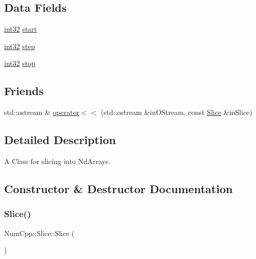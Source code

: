 \subsection*{Data Fields}
\begin{DoxyCompactItemize}
\item 
\mbox{\hyperlink{namespace_num_cpp_acf3eb1592f8b248ff0a236634864633c}{int32}} \mbox{\hyperlink{class_num_cpp_1_1_slice_a2b304f62d107e09756fdebf45029d333}{start}}
\item 
\mbox{\hyperlink{namespace_num_cpp_acf3eb1592f8b248ff0a236634864633c}{int32}} \mbox{\hyperlink{class_num_cpp_1_1_slice_a7a20894f3625159ed878124664887aff}{step}}
\item 
\mbox{\hyperlink{namespace_num_cpp_acf3eb1592f8b248ff0a236634864633c}{int32}} \mbox{\hyperlink{class_num_cpp_1_1_slice_a443abc110225a97be15c02b1b89c10f3}{stop}}
\end{DoxyCompactItemize}
\subsection*{Friends}
\begin{DoxyCompactItemize}
\item 
std\+::ostream \& \mbox{\hyperlink{class_num_cpp_1_1_slice_ad6889d2df295fef3796aebb769b8cac0}{operator$<$$<$}} (std\+::ostream \&in\+O\+Stream, const \mbox{\hyperlink{class_num_cpp_1_1_slice}{Slice}} \&in\+Slice)
\end{DoxyCompactItemize}


\subsection{Detailed Description}
A Class for slicing into Nd\+Arrays. 

\subsection{Constructor \& Destructor Documentation}
\mbox{\label{class_num_cpp_1_1_slice_afb92692f125347a65ef8bcb360529afc}} 
\subsubsection{\texorpdfstring{Slice()}{Slice()}\hspace{0.1cm}{\footnotesize\ttfamily [1/4]}}
{\footnotesize\ttfamily Num\+Cpp\+::\+Slice\+::\+Slice (\begin{DoxyParamCaption}{ }\end{DoxyParamCaption})\hspace{0.3cm}{\ttfamily [inline]}}

